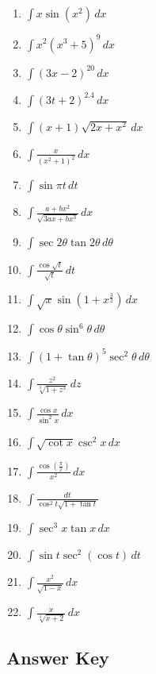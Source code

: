 \documentclass[12pt]{article}
\newcommand{\mins}{-}
\newcommand{\inline}[1]{\({#1}\)}
\begin{document}
        \begin{enumerate}
            \item \inline{\int{} x \sin{(x^2)} \, dx}
            \item \inline{\int{} x^2 {(x^3 + 5)}^9 \, dx}
            \item \inline{\int{} {(3x \mins{} 2)}^{20} \, dx}
            \item \inline{\int{} {(3t + 2)}^{2.4} \, dx}
            \item \inline{\int{} (x + 1) \sqrt{2x + x^2} \, dx}
            \item \inline{\int{} \frac{x}{{({x^2 + 1})}^2} \, dx}
            \item \inline{\int{} \sin{\pi{} t} \, dt}
            \item \inline{\int{} \frac{a + bx^2}{\sqrt{3ax + bx^3}} \, dx}
            \item \inline{\int{} \sec{2\theta{}} \tan{2\theta{}} \, d\theta}
            \item \inline{\int{} \frac{\cos{\sqrt{t}}}{\sqrt{t}} \, dt}
            \item \inline{\int{} \sqrt{x} \sin{(1 + x^{\frac{3}{2}})} \, dx}
            \item \inline{\int{} \cos{\theta{}} \sin^6{\theta{}} \, d\theta{}}
            \item \inline{\int{} {(1 + \tan{\theta})}^5 \sec^2{\theta{}} \, d\theta{}}
            \item \inline{\int{} \frac{z^2}{\sqrt[3]{1 + z^3}} \, dz}
            \item \inline{\int{} \frac{\cos{x}}{\sin^2{x}} \, dx}
            \item \inline{\int{} \sqrt{\cot{x}} \csc^2{x} \, dx}
            \item \inline{\int{} \frac{\cos{(\frac{\pi{}}{x})}}{x^2} \, dx}
            \item \inline{\int{} \frac{dt}{\cos^2{t} \sqrt{1 + \tan{t}}}}
            \item \inline{\int{} \sec^3{x} \tan{x} \, dx}
            \item \inline{\int{} \sin{t} \sec^2{(\cos{t})} \, dt}
            \item \inline{\int{} \frac{x^2}{\sqrt{1 \mins{} x}} \, dx}
            \item \inline{\int{} \frac{x}{\sqrt[4]{x + 2}} \, dx}
        \end{enumerate}
    
    \newpage\subsection*{Answer Key}
\end{document}
